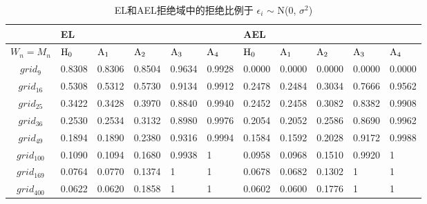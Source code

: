 \documentclass[a4paper,c5size,onecolumn,twoside,cap,Chinese]{APSart}
\begin{document}
\begin{table}[htbp]
\small
\setlength{\abovecaptionskip}{0.cm}%
\centering
\caption{EL和AEL拒绝域中的拒绝比例于 $\epsilon_{i}$ $\sim$ N(0, $\sigma^2$)\label{table:6}}

\begin{tabular*}{\hsize}{@{}@{\extracolsep{\fill}}cllllllllll@{}}
\hline
  &EL&&&&&AEL&&\\
\hline
  $W_n=M_n$ & $\rm{H_0}$ & $\rm{A_1}$ & $\rm{A_2}$ & $\rm{A_3}$ & $\rm{A_4}$ & $\rm{H_0}$ & $\rm{A_1}$ &$\rm{A_2}$ & $\rm{A_3}$& $\rm{A_4}$\\
\hline
$grid_{9}$  & 0.8308 & 0.8306 & 0.8504 & 0.9634 & 0.9928 & 0.0000 & 0.0000 & 0.0000 & 0.0000 &0.0000\\
$grid_{16}$  &  0.5308 & 0.5312 & 0.5730 & 0.9134  & 0.9912 & 0.2478 & 0.2484 & 0.3034 & 0.7666& 0.9562\\
$grid_{25}$   & 0.3422 & 0.3428 & 0.3970 & 0.8840 & 0.9940 & 0.2452 & 0.2458 & 0.3082 & 0.8382&0.9908\\
$grid_{36}$   & 0.2530 & 0.2534 & 0.3132 & 0.8980 & 0.9976 & 0.2054 & 0.2052 & 0.2586 & 0.8690& 0.9962\\
$grid_{49}$   & 0.1894 & 0.1890 & 0.2380 & 0.9316 & 0.9994 & 0.1584 & 0.1592 & 0.2028 & 0.9172& 0.9988\\
$grid_{100}$  &  0.1090 & 0.1094 & 0.1680 & 0.9938 &  1 & 0.0958 & 0.0968 & 0.1510 & 0.9920& 1  \\
$grid_{169}$  &  0.0764 & 0.0770 & 0.1374 & 1  &  1 & 0.0678 & 0.0682 & 0.1302 & 1 & 1  \\
$grid_{400}$  &  0.0622 & 0.0620 & 0.1858 & 1  &  1 & 0.0602 & 0.0600 & 0.1776 & 1 & 1  \\
\hline
\end{tabular*}

\end{table}
\end{document}
